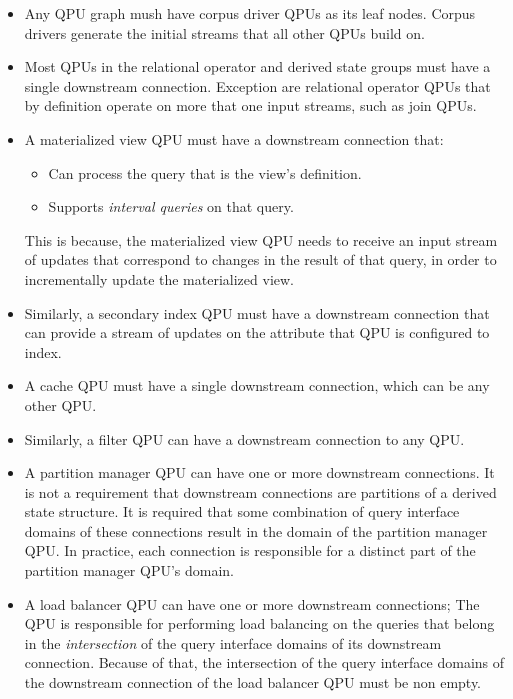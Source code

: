\begin{itemize}
  \item Any QPU graph mush have corpus driver QPUs as its leaf nodes.
  Corpus drivers generate the initial streams that all other QPUs build on.

  \item Most QPUs in the relational operator and derived state groups must have a single downstream connection.
  Exception are relational operator QPUs that by definition operate on more that one input streams, such as join QPUs.

  \item A materialized view QPU must have a downstream connection that:
  \begin{itemize}
    \item Can process the query that is the view's definition.
    \item Supports \textit{interval queries} on that query.
  \end{itemize}
  This is because, the materialized view QPU needs to receive an input stream of updates that correspond to changes in
  the result of that query, in order to incrementally update the materialized view.

  \item Similarly, a secondary index QPU must have a downstream connection that can provide a stream of updates on the
  attribute that QPU is configured to index.

  \item A cache QPU must have a single downstream connection, which can be any other QPU.

  \item Similarly, a filter QPU can have a downstream connection to any QPU.

  \item A partition manager QPU can have one or more downstream connections.
  It is not a requirement that downstream connections are partitions of a derived state structure.
  It is required that some combination of query interface domains of these connections result in the domain of the
  partition manager QPU.
  In practice, each connection is responsible for a distinct part of the partition manager QPU's domain.

  \item A load balancer QPU can have one or more downstream connections;
  The QPU is responsible for performing load balancing on the queries that belong in the \textit{intersection} of the
  query interface domains of its downstream connection.
  Because of that, the intersection of the query interface domains of the downstream connection of the load balancer
  QPU must be non empty.
\end{itemize}

